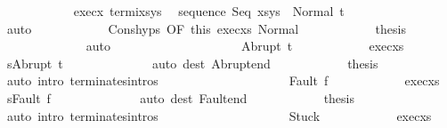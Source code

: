 \begin{isabellebody}
\ \ \ \ \ \ \ \ \ \ \isamarkupfalse%
\ exec{\isacharunderscore}x\ termi{\isacharunderscore}xs{\isacharunderscore}ys\ \isamarkupfalse%
\ {\isachardoublequoteopen}{\isasymGamma}{\isasymturnstile}sequence\ Seq\ {\isacharparenleft}xs{\isacharat}ys{\isacharparenright}\ {\isasymdown}\ Normal\ t{\isacharprime}{\isachardoublequoteclose}\isanewline
\ \ \ \ \ \ \ \ \ \ \ \ \isamarkupfalse%
\ auto\isanewline
\ \ \ \ \ \ \ \ \ \ \isamarkupfalse%
\ Cons{\isachardot}hyps\ {\isacharbrackleft}OF\ this{\isacharbrackright}\ exec{\isacharunderscore}xs\ Normal\isanewline
\ \ \ \ \ \ \ \ \ \ \isamarkupfalse%
\ {\isacharquery}thesis\isanewline
\ \ \ \ \ \ \ \ \ \ \ \ \isamarkupfalse%
\ auto\isanewline
\ \ \ \ \ \ \ \ \isamarkupfalse%
\isanewline
\ \ \ \ \ \ \ \ \ \ \isamarkupfalse%
\ {\isacharparenleft}Abrupt\ t{\isacharprime}{\isacharparenright}\isanewline
\ \ \ \ \ \ \ \ \ \ \isamarkupfalse%
\ exec{\isacharunderscore}xs\ \isamarkupfalse%
\ {\isachardoublequoteopen}s{\isacharprime}{\isacharequal}Abrupt\ t{\isacharprime}{\isachardoublequoteclose}\isanewline
\ \ \ \ \ \ \ \ \ \ \ \ \isamarkupfalse%
\ {\isacharparenleft}auto\ dest{\isacharcolon}\ Abrupt{\isacharunderscore}end{\isacharparenright}\isanewline
\ \ \ \ \ \ \ \ \ \ \isamarkupfalse%
\ {\isacharquery}thesis\ \isamarkupfalse%
\ {\isacharparenleft}auto\ intro{\isacharcolon}\ terminates{\isachardot}intros{\isacharparenright}\isanewline
\ \ \ \ \ \ \ \ \isamarkupfalse%
\isanewline
\ \ \ \ \ \ \ \ \ \ \isamarkupfalse%
\ {\isacharparenleft}Fault\ f{\isacharparenright}\isanewline
\ \ \ \ \ \ \ \ \ \ \isamarkupfalse%
\ exec{\isacharunderscore}xs\ \isamarkupfalse%
\ {\isachardoublequoteopen}s{\isacharprime}{\isacharequal}Fault\ f{\isachardoublequoteclose}\isanewline
\ \ \ \ \ \ \ \ \ \ \ \ \isamarkupfalse%
\ {\isacharparenleft}auto\ dest{\isacharcolon}\ Fault{\isacharunderscore}end{\isacharparenright}\isanewline
\ \ \ \ \ \ \ \ \ \ \isamarkupfalse%
\ {\isacharquery}thesis\ \isamarkupfalse%
\ {\isacharparenleft}auto\ intro{\isacharcolon}\ terminates{\isachardot}intros{\isacharparenright}\isanewline
\ \ \ \ \ \ \ \ \isamarkupfalse%
\isanewline
\ \ \ \ \ \ \ \ \ \ \isamarkupfalse%
\ Stuck\isanewline
\ \ \ \ \ \ \ \ \ \ \isamarkupfalse%
\ exec{\isacharunderscore}xs\ \isamarkupfalse%

\end{isabellebody}
